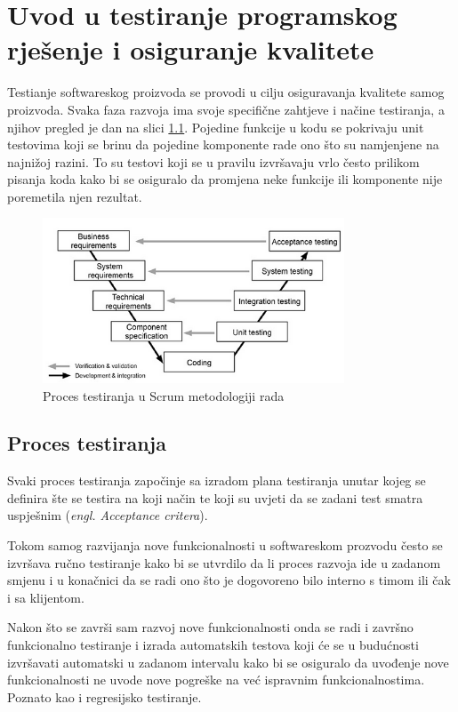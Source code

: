 \chapter{Uvod u testiranje programskog rješenje i osiguranje kvalitete}\label{uvodQA}

Testianje softwareskog proizvoda se provodi u cilju osiguravanja kvalitete samog proizvoda.
Svaka faza razvoja ima svoje specifične zahtjeve i načine testiranja, a njihov pregled je dan na slici \ref{img:testingInScrum}.
Pojedine funkcije u kodu se pokrivaju unit testovima koji se brinu da pojedine komponente rade ono što su namjenjene na najnižoj razini. To su testovi koji se u pravilu izvršavaju vrlo često prilikom pisanja koda kako bi se osiguralo da promjena neke funkcije ili komponente nije poremetila njen rezultat.


\begin{figure}[!h]\begin{center}
\includegraphics[width=0.8\textwidth]{"img/testPhasesScrum"}
\caption{Proces testiranja u Scrum metodologiji rada}\label{img:testingInScrum}
\end{center}\end{figure}

\section{Proces testiranja}
Svaki proces testiranja započinje sa izradom plana testiranja unutar kojeg se definira šte se testira na koji način te koji su uvjeti da se zadani test smatra uspješnim (\textit{engl. Acceptance critera}).

Tokom samog razvijanja nove funkcionalnosti u softwareskom prozvodu često se izvršava ručno testiranje kako bi se utvrdilo da li proces razvoja ide u zadanom smjenu i u konačnici da se radi ono što je dogovoreno bilo interno s timom ili čak i sa klijentom.

Nakon što se završi sam razvoj nove funkcionalnosti onda se radi i završno funkcionalno testiranje i izrada automatskih testova koji će se u budućnosti izvršavati automatski u zadanom intervalu kako bi se osiguralo da uvođenje nove funkcionalnosti ne uvode nove pogreške na već ispravnim funkcionalnostima.
Poznato kao i regresijsko testiranje.

